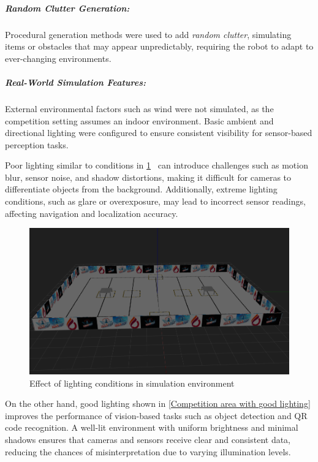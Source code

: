 \documentclass[../../main]{subfiles}
\begin{document}
    \subparagraph{Random Clutter Generation:} Procedural generation methods were used to add \emph{random clutter}, 
    simulating items or obstacles that may appear unpredictably, requiring the robot to adapt to ever-changing environments. 
    
    \subparagraph{Real-World Simulation Features:} External environmental factors such as wind were not simulated,  
    as the competition setting assumes an indoor environment.  
    Basic ambient and directional lighting were configured to ensure  
    consistent visibility for sensor-based perception tasks.  
    
    Poor lighting similar to conditions in \cref{Competition area with bad lighting}~ can introduce challenges 
    such as motion blur, sensor noise, and shadow distortions,  
    making it difficult for cameras to differentiate objects from the background.  
    Additionally, extreme lighting conditions, such as glare or overexposure,  
    may lead to incorrect sensor readings, affecting navigation and localization accuracy.  
    
    \begin{figure}[H]
      \centering
  \includegraphics[width=\textwidth]{fig/competition_area_no_light.png}
  \caption{Effect of lighting conditions in simulation environment}
  \label{Competition area with bad lighting} %
  \end{figure}

    On the other hand, good lighting shown in \cref{Competition area with good lighting} improves the performance of vision-based tasks  
    such as object detection and QR code recognition.  
    A well-lit environment with uniform brightness and minimal shadows  
    ensures that cameras and sensors receive clear and consistent data,  
    reducing the chances of misinterpretation due to varying illumination levels. 
   
\end{document}
